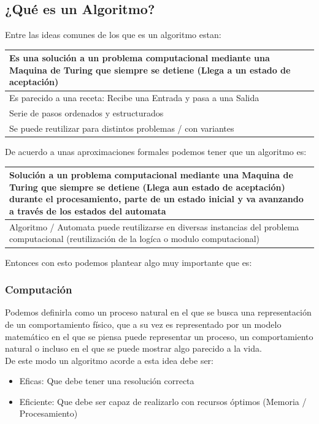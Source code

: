 \documentclass[10pt,executivepaper]{article}
\begin{document}
\subsection{¿Qué es un Algoritmo?}
Entre las ideas comunes de los que es un algoritmo estan:
\begin{center}
	\begin{tabular}{|p{11cm}|}
		\hline
		Es una solución a un problema computacional mediante una Maquina de Turing que siempre se detiene (Llega a un estado de aceptación)\\
		\hline
		Es parecido a una receta: Recibe una Entrada y pasa a una Salida\\
		\hline
		Serie de pasos ordenados y estructurados\\
		\hline
		Se puede reutilizar para distintos problemas / con variantes\\
		\hline
	\end{tabular}
\end{center}
De acuerdo a unas aproximaciones formales podemos tener que un algoritmo es:
\begin{center}
	\begin{tabular}{|p{11cm}|}
		\hline
		Solución a un problema computacional mediante una Maquina de Turing que siempre se detiene (Llega aun estado de aceptación) durante el procesamiento, parte de un estado inicial y va avanzando a través de los estados del automata\\
		\hline
		Algoritmo / Automata puede reutilizarse en diversas instancias del problema computacional (reutilización de la logíca o modulo computacional)\\
		\hline
	\end{tabular}
\end{center}
Entonces con esto podemos plantear algo muy importante que es:
\subsubsection{Computación}
Podemos definirla como un proceso natural en el que se busca una representación de un comportamiento físico, que a su vez es representado por un modelo matemático en el que se piensa puede representar un proceso, un comportamiento natural o incluso en el que se puede mostrar algo parecido a la vida.
\\
De este modo un algoritmo acorde a esta idea debe ser:
\begin{itemize}
	\item Eficas: Que debe tener una resolución correcta
	\item Eficiente: Que debe ser capaz de realizarlo con recursos óptimos (Memoria / Procesamiento)
\end{itemize}
\end{document}
